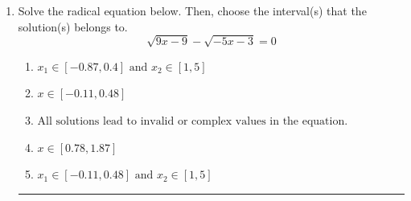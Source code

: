 \documentclass[14pt]{extbook}
\newcommand{\litem}[1]{\item#1\hspace*{-1cm}\rule{\textwidth}{0.4pt}}
\begin{document}
\begin{enumerate}
{\begin{enumerate}[label=\Alph*.]
\end{enumerate} }
\litem{
Solve the radical equation below. Then, choose the interval(s) that the solution(s) belongs to.\[ \sqrt{9 x - 9} - \sqrt{-5 x - 3} = 0 \]\begin{enumerate}[label=\Alph*.]
\item \( x_1 \in [-0.87, 0.4] \text{ and } x_2 \in [1,5] \)
\item \( x \in [-0.11,0.48] \)
\item \( \text{All solutions lead to invalid or complex values in the equation.} \)
\item \( x \in [0.78,1.87] \)
\item \( x_1 \in [-0.11, 0.48] \text{ and } x_2 \in [1,5] \)

\end{enumerate} }
\end{enumerate}
\end{document}
